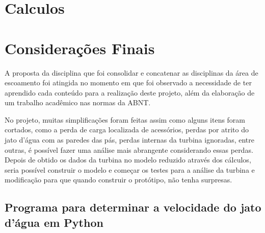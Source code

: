 \documentclass[a4paper, 12pt, openany, oneside, brazil]{abntex2} %
\begin{document}


\chapter{Calculos}

\chapter{Considerações Finais}

    A proposta da disciplina que foi consolidar e concatenar as disciplinas da área de escoamento foi atingida no momento em que foi observado a necessidade de ter aprendido cada conteúdo para a realização deste projeto, além da elaboração de um trabalho acadêmico nas normas da ABNT.

    No projeto, muitas simplificações foram feitas assim como alguns itens foram cortados, como a perda de carga localizada de acessórios, perdas por atrito do jato d'água com as paredes das pás, perdas internas da turbina ignoradas, entre outras, é possível fazer uma análise mais abrangente considerando essas perdas. Depois de obtido os dados da turbina no modelo reduzido através dos cálculos, seria possível construir o modelo e começar os testes para a análise da turbina e modificação para que quando construir o protótipo, não tenha surpresas.

% 



\begin{apendicesenv}


\chapter{Programa para determinar a velocidade do jato d'água em Python}
\label{ap-python}
 


\end{apendicesenv}
\end{document}
